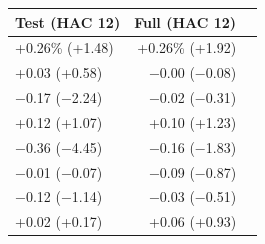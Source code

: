 \begin{tabular}{lrr}
\toprule
Test (HAC 12) & Full (HAC 12) \\
\midrule
+0.26\% (+1.48) & +0.26\% (+1.92) \\
+0.03 (+0.58) & $-$0.00 ($-$0.08) \\
$-$0.17 ($-$2.24) & $-$0.02 ($-$0.31) \\
+0.12 (+1.07) & +0.10 (+1.23) \\
$-$0.36 ($-$4.45) & $-$0.16 ($-$1.83) \\
$-$0.01 ($-$0.07) & $-$0.09 ($-$0.87) \\
$-$0.12 ($-$1.14) & $-$0.03 ($-$0.51) \\
+0.02 (+0.17) & +0.06 (+0.93) \\
\bottomrule
\end{tabular}

